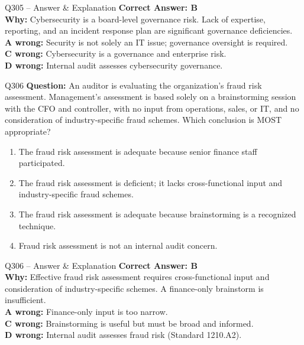 \documentclass[aspectratio=169,10pt]{beamer}
\begin{document}
	\begin{frame}[t]{Q305 -- Answer \& Explanation}
		\small
		\textbf{Correct Answer: B} \\[4pt]
		\textbf{Why:} Cybersecurity is a board-level governance risk. Lack of expertise, reporting, and an incident response plan are significant governance deficiencies. \\[4pt]
		\textbf{A wrong:} Security is not solely an IT issue; governance oversight is required. \\[2pt]
		\textbf{C wrong:} Cybersecurity is a governance and enterprise risk. \\[2pt]
		\textbf{D wrong:} Internal audit assesses cybersecurity governance.
	\end{frame}
	
	\begin{frame}[t]{Q306}
		\small
		\textbf{Question:} An auditor is evaluating the organization's fraud risk assessment. Management's assessment is based solely on a brainstorming session with the CFO and controller, with no input from operations, sales, or IT, and no consideration of industry-specific fraud schemes. Which conclusion is MOST appropriate?
		\begin{enumerate}[label=\Alph*.,itemsep=1pt,topsep=2pt]
			\item The fraud risk assessment is adequate because senior finance staff participated.
			\item The fraud risk assessment is deficient; it lacks cross-functional input and industry-specific fraud schemes.
			\item The fraud risk assessment is adequate because brainstorming is a recognized technique.
			\item Fraud risk assessment is not an internal audit concern.
		\end{enumerate}
	\end{frame}
	
	\begin{frame}[t]{Q306 -- Answer \& Explanation}
		\small
		\textbf{Correct Answer: B} \\[4pt]
		\textbf{Why:} Effective fraud risk assessment requires cross-functional input and consideration of industry-specific schemes. A finance-only brainstorm is insufficient. \\[4pt]
		\textbf{A wrong:} Finance-only input is too narrow. \\[2pt]
		\textbf{C wrong:} Brainstorming is useful but must be broad and informed. \\[2pt]
		\textbf{D wrong:} Internal audit assesses fraud risk (Standard 1210.A2).
	\end{frame}
	
\end{document}
